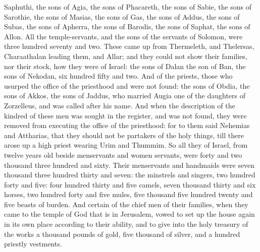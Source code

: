 { Saphuthi,
the sons of
 Agia, the sons of
 Phacareth, the sons of Sabie, the sons of Sarothie, the sons of
 Masias, the sons of Gas, the sons of Addus, the sons of Subas, the sons of Apherra, the sons of Barodis, the sons of Saphat, the sons of Allon.
All the temple-servants, and the sons of the servants of Solomon, were three hundred seventy and two.
These came up from
 Thermeleth, and
 Thelersas,
 Charaathalan leading them, and Allar;
and they could not show their families, nor their stock, how they were of Israel: the sons of
 Dalan the son of
 Ban, the sons of
 Nekodan, six hundred fifty and two.
And of the priests, those who usurped the office of the priesthood and were not found: the sons of
 Obdia, the sons of
 Akkos, the sons of Jaddus, who married Augia one of the daughters of
 Zorzelleus, and was called after his name.
And when the description of the kindred of these men was sought in the register, and was not found, they were removed from executing the office of the priesthood:
for to them said Nehemias and Attharias, that they should not be partakers of the holy things, till there arose up a high priest wearing
 Urim and Thummim.
So all they of Israel, from twelve years old
{} beside menservants and women servants, were
{} forty and two thousand three hundred and sixty.
Their menservants and handmaids were seven thousand three hundred thirty and seven: the minstrels and singers, two hundred forty and five:
four hundred thirty and five camels, seven
 thousand thirty and six horses, two hundred forty and five mules, five thousand five hundred twenty and five beasts of burden.
And certain of the chief men of their families, when they came to the temple of God that is in Jerusalem, vowed to set up the house again in its own place according to their ability,
and to give into the holy treasury of the works a thousand pounds of gold, five thousand of silver, and a hundred priestly vestments.
}
